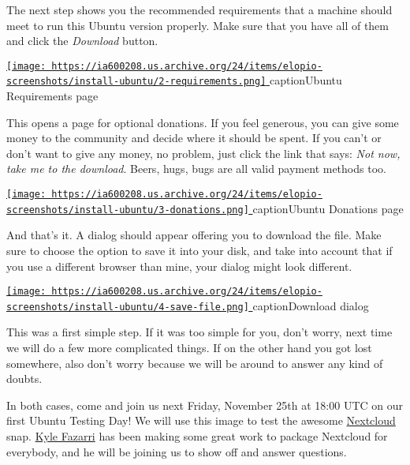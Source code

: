 \documentclass[12pt]{article}
\begin{document}
The next step shows you the recommended requirements that a machine should
meet to run this Ubuntu version properly. Make sure that you have all of them
and click the \emph{Download} button.

\begin{center}
  \href{
    https://ia600208.us.archive.org/24/items/elopio-screenshots/install-ubuntu/2-requirements.png}{
    \texttt{[image: 
    https://ia600208.us.archive.org/24/items/elopio-screenshots/install-ubuntu/2-requirements.png]}
  }
  caption{Ubuntu Requirements page}
\end{center}

This opens a page for optional donations. If you feel generous, you can give
some money to the community and decide where it should be spent. If you can't
or don't want to give any money, no problem, just click the link that says:
\emph{Not now, take me to the download}. Beers, hugs, bugs are all valid
payment methods too.

\begin{center}
  \href{
    https://ia600208.us.archive.org/24/items/elopio-screenshots/install-ubuntu/3-donations.png}{
    \texttt{[image: 
    https://ia600208.us.archive.org/24/items/elopio-screenshots/install-ubuntu/3-donations.png]}
  }
  caption{Ubuntu Donations page}
\end{center}

And that's it. A dialog should appear offering you to download the file. Make
sure to choose the option to save it into your disk, and take into account
that if you use a different browser than mine, your dialog might look
different.

\begin{center}
  \href{
    https://ia600208.us.archive.org/24/items/elopio-screenshots/install-ubuntu/4-save-file.png}{
    \texttt{[image: 
    https://ia600208.us.archive.org/24/items/elopio-screenshots/install-ubuntu/4-save-file.png]}
  }
  caption{Download dialog}
\end{center}

This was a first simple step. If it was too simple for you, don't worry, next
time we will do a few more complicated things. If on the other hand you got
lost somewhere, also don't worry because we will be around to answer any kind
of doubts.

In both cases, come and join us next Friday, November 25th at 18:00 UTC on our
first Ubuntu Testing Day! We will use this image to test the awesome
\href{https://nextcloud.com/}{Nextcloud} snap.
\href{https://kyrofa.com/}{Kyle Fazarri} has been making some great work to
package Nextcloud for everybody, and he will be joining us to show off and
answer questions.
\end{document}
